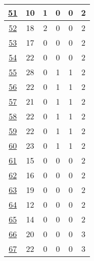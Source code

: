 \begin{table}
\begin{center}
\begin{tabular}{|c|c|c|c|c|c|}
			\hline
			\href{https://purl.org/emi#examples011b}{51} & 10 & 1 & 0 & 0 & 2 \\
			\hline
			\href{https://purl.org/emi#examples019a}{52} & 18 & 2 & 0 & 0 & 2 \\
			\hline
			\href{https://purl.org/emi#examples019b}{53} & 17 & 0 & 0 & 0 & 2 \\
			\hline
			\href{https://biosoda.unil.ch/emi/sparql/.well-known/sparql-examples/009}{54} & 22 & 0 & 0 & 0 & 2 \\
			\hline
			\href{https://purl.org/emi#examples013}{55} & 28 & 0 & 1 & 1 & 2 \\
			\hline
			\href{https://purl.org/emi#examples015}{56} & 22 & 0 & 1 & 1 & 2 \\
			\hline
			\href{https://purl.org/emi#examples018}{57} & 21 & 0 & 1 & 1 & 2 \\
			\hline
			\href{https://purl.org/emi#examples012}{58} & 22 & 0 & 1 & 1 & 2 \\
			\hline
			\href{https://purl.org/emi#examples021}{59} & 22 & 0 & 1 & 1 & 2 \\
			\hline
			\href{https://biosoda.unil.ch/emi/sparql/.well-known/sparql-examples/007}{60} & 23 & 0 & 1 & 1 & 2 \\
			\hline
			\href{https://biosoda.unil.ch/emi/sparql/.well-known/sparql-examples/002}{61} & 15 & 0 & 0 & 0 & 2 \\
			\hline
			\href{https://sparql.uniprot.org/.well-known/sparql-examples/116_biosodafrontend_rabit_mouse_orthologs}{62} & 16 & 0 & 0 & 0 & 2 \\
			\hline
			\href{https://sparql.omabrowser.org/.well-known/sparql-examples/15-rat-TP53-biosodafrontend}{63} & 19 & 0 & 0 & 0 & 2 \\
			\hline
			\href{https://www.bgee.org/sparql/.well-known/sparql-examples/027-biosodafrontend}{64} & 12 & 0 & 0 & 0 & 2 \\
			\hline
			\href{https://www.bgee.org/sparql/.well-known/sparql-examples/028-biosodafrontend}{65} & 14 & 0 & 0 & 0 & 2 \\
			\hline
			\href{https://sparql.uniprot.org/.well-known/sparql-examples/117_biosodafrontend_glioblastoma_orthologs_rat}{66} & 20 & 0 & 0 & 0 & 3 \\
			\hline
			\href{https://sparql.uniprot.org/.well-known/sparql-examples/118_biosodafrontend_rat_brain_human_cancer}{67} & 22 & 0 & 0 & 0 & 3 \\
			\hline
		\end{tabular}
	\end{center}
\end{table}